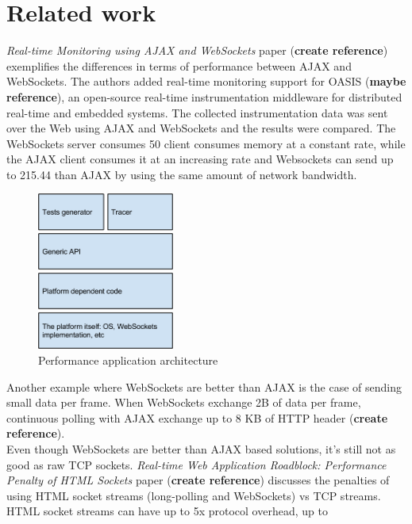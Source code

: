 \documentclass[conference]{IEEEtran}
\begin{document}
\section{Related work}
\textit{Real-time Monitoring using AJAX and WebSockets} paper (\textbf{create reference})
exemplifies the differences in terms of performance between AJAX and WebSockets.
The authors added real-time monitoring support for OASIS (\textbf{maybe reference}),
an open-source real-time instrumentation middleware for distributed real-time
and embedded systems. The collected instrumentation data was sent over the Web
using AJAX and WebSockets and the results were compared. The WebSockets server
consumes 50%
client consumes memory at a constant rate, while the AJAX client consumes it
at an increasing rate and Websockets can send up to 215.44%
than AJAX by using the same amount of network bandwidth.
\\
\begin{frame}{}
  \begin{figure}
    \centering
    \includegraphics[width=0.4\textwidth]{Architecture.png}
    \caption{Performance application architecture}
  \end{figure}
\end{frame}
\indent
Another example where WebSockets are better than AJAX is the case of sending
small data per frame. When WebSockets exchange 2B of data per frame, continuous
polling with AJAX exchange up to 8 KB of HTTP header (\textbf{create reference}).
\\
\indent
Even though WebSockets are better than AJAX based solutions, it's still not as
good as raw TCP sockets. \textit{Real-time Web Application Roadblock:
Performance Penalty of HTML Sockets} paper (\textbf{create reference}) discusses
the penalties of using HTML socket streams (long-polling and WebSockets)
vs TCP streams. HTML socket streams can have up to 5x protocol overhead, up to
\end{document}
